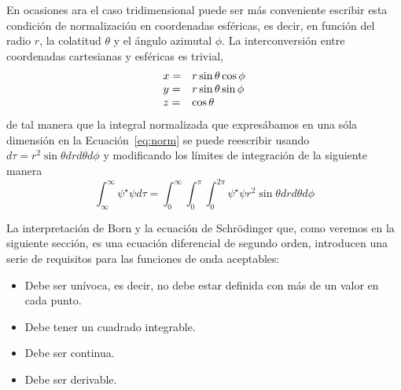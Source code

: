 En ocasiones ara el caso tridimensional puede 
ser más conveniente escribir esta condición de 
normalización en coordenadas esféricas, es decir,
en función del radio $r$, la colatitud $\theta$
y el ángulo azimutal $\phi$. La interconversión
entre coordenadas cartesianas y esféricas es 
trivial, 
\begin{equation}
  \begin{array}{@{}ll@{}}
    x = & r\sin\theta\cos\phi \\
    y = & r\sin\theta\sin\phi \\
    z = & \cos \theta
  \end{array}
\end{equation}
de tal manera que la integral normalizada que 
expresábamos en una sóla dimensión en la 
Ecuación~\ref{eq:norm} se puede reescribir usando
$d\tau=r^2\sin\theta drd\theta d\phi$ y modificando
los límites de integración de la siguiente manera
\begin{equation}
    \int_\infty^\infty\psi^\star\psi d\tau=
    \int_0^\infty\int_0^\pi\int_0^{2\pi}\psi^\star\psi r^2\sin\theta drd\theta d\phi
\end{equation}

La interpretación de Born y la ecuación de Schrödinger
que, como veremos en la siguiente sección, es una ecuación
diferencial de segundo orden, introducen una serie de
requisitos para las funciones de onda aceptables:
\begin{itemize}
    \item Debe ser unívoca, es decir, no debe 
    estar definida con más de un valor en cada punto.
    \item Debe tener un cuadrado integrable.
    \item Debe ser continua.
    \item Debe ser derivable.
\end{itemize}

